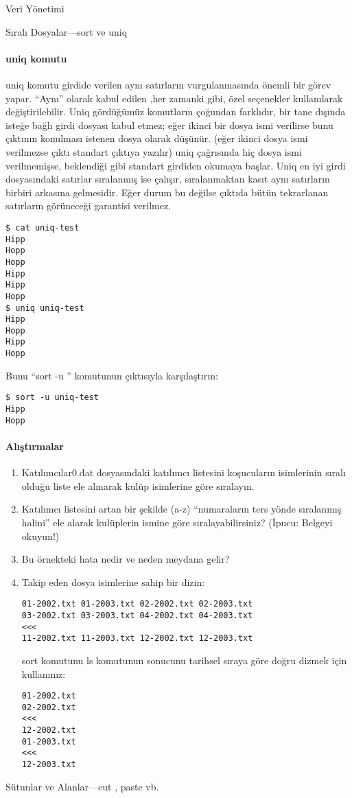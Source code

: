 \begin{section}{Veri Yönetimi}
\begin{subsection}{Sıralı Dosyalar—sort ve uniq}
\paragraph{uniq komutu}{uniq komutu girdide verilen aynı satırların vurgulanmasında önemli bir görev yapar.  “Aynı” olarak kabul edilen ,her zamanki gibi, özel seçenekler kullanılarak değiştirilebilir. Uniq gördüğümüz komutların çoğundan farklıdır, bir tane dışında isteğe bağlı girdi dosyası kabul etmez; eğer ikinci bir dosya ismi verilirse bunu çıktının konulması istenen dosya olarak düşünür. (eğer ikinci dosya ismi verilmezse çıktı standart çıktıya yazılır) uniq çağrısında hiç dosya ismi verilmemişse, beklendiği gibi standart girdiden okumaya başlar. Uniq en iyi girdi dosyasındaki satırlar sıralanmış ise çalışır, sıralanmaktan kasıt aynı satırların birbiri arkasına gelmesidir. Eğer durum bu değilse çıktıda bütün tekrarlanan satırların görüneceği garantisi verilmez.}
\begin{verbatim}
$ cat uniq-test
Hipp
Hopp
Hopp
Hipp
Hipp
Hopp
$ uniq uniq-test
Hipp
Hopp
Hipp
Hopp
\end{verbatim}

Bunu “sort -u ” komutunun çıktısıyla karşılaştırın:
\begin{verbatim}
$ sort -u uniq-test
Hipp
Hopp
\end{verbatim}

\paragraph{{\Huge{\PencilLeftDown}}Alıştırmalar}{
\begin{enumerate}
 \item Katılımcılar0.dat dosyasındaki katılımcı listesini koşucuların isimlerinin sıralı olduğu liste ele alınarak kulüp isimlerine göre sıralayın.
 \item Katılımcı listesini artan bir şekilde (a-z) “numaraların ters yönde sıralanmış halini” ele alarak kulüplerin ismine göre sıralayabilirsiniz? (İpucu: Belgeyi okuyun!)
 \item Bu örnekteki hata nedir ve neden meydana gelir?
 \item Takip eden dosya isimlerine sahip bir dizin: 
 \begin{verbatim}
01-2002.txt 01-2003.txt 02-2002.txt 02-2003.txt
03-2002.txt 03-2003.txt 04-2002.txt 04-2003.txt
<<<
11-2002.txt 11-2003.txt 12-2002.txt 12-2003.txt
 \end{verbatim}
 sort komutunu ls komutunun sonucunu tarihsel sıraya göre doğru dizmek için kullanınız:
 \begin{verbatim}
01-2002.txt
02-2002.txt
<<<
12-2002.txt
01-2003.txt
<<<
12-2003.txt
 \end{verbatim}
\end{enumerate}}
\end{subsection}
\begin{subsection}{Sütunlar ve Alanlar—cut , paste vb.}


\end{subsection}
\end{section}
